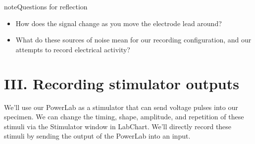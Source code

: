 \documentclass[letterpaper,10pt,english]{jupyterBook}
\begin{document}
\begin{sphinxadmonition}{note}{Questions for reflection}
\begin{itemize}
\item {} 
\sphinxAtStartPar
How does the signal change as you move the electrode lead around?

\item {} 
\sphinxAtStartPar
What do these sources of noise mean for our recording configuration, and our attempts to record electrical activity?

\end{itemize}
\end{sphinxadmonition}


\section{III. Recording stimulator outputs}
\label{\detokenize{StringNervousSystems:iii-recording-stimulator-outputs}}
\sphinxAtStartPar
We’ll use our PowerLab as a stimulator that can send voltage pulses into our specimen. We can change the timing, shape, amplitude, and repetition of these stimuli via the Stimulator window in LabChart. We’ll directly record these stimuli by sending the output of the PowerLab into an input.
\end{document}
